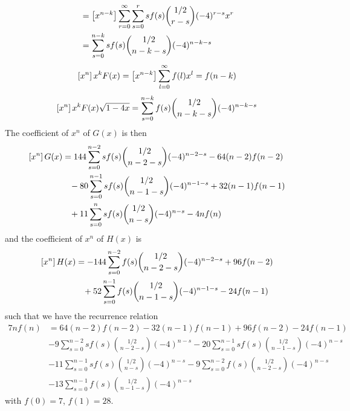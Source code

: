 \begin{solution}
\begin{align*}
    &= \coeff{x^{n-k}} \bsum[r]\sum_{s=0}^r sf(s) \binom{1/2}{r-s}(-4)^{r-s} x^r \\
    &= \sum_{s=0}^{n-k} sf(s) \binom{1/2}{n-k-s}(-4)^{n-k - s}
\end{align*}
\[
    \coeff{x^n} x^{k} F(x) = \coeff{x^{n-k}} \bsum[l] f(l)x^l = f(n-k)
\]
\begin{align*}
    \coeff{x^n} x^k F(x) \sqrt{1-4x}= \sum_{s=0}^{n-k} f(s) \binom{1/2}{n-k-s}(-4)^{n-k-s}
\end{align*}
The coefficient of $x^n$ of $G(x)$ is then
\begin{align*}
    \coeff{x^n}G(x) &= 144 \sum_{s=0}^{n-2} sf(s) \binom{1/2}{n-2-s}(-4)^{n-2-s} - 64 (n-2)f(n-2)  \\
    &\mspace{15mu} - 80\sum_{s=0}^{n-1} sf(s) \binom{1/2}{n-1-s} (-4)^{n-1-s} + 32 (n-1)f(n-1)  \\
    &\mspace{15mu} + 11 \sum_{s=0}^n sf(s) \binom{1/2}{n-s}(-4)^{n-s} - 4 n f(n)
\end{align*}
and the coefficient of $x^n$ of $H(x)$ is
\begin{align*}
    \coeff{x^n}H(x) &= -144 \sum_{s=0}^{n-2} f(s) \binom{1/2}{n-2-s} (-4)^{n-2-s} + 96 f(n-2) \\ &\mspace{15mu}  + 52 \sum_{s=0}^{n-1} f(s)\binom{1/2}{n-1-s} (-4)^{n-1-s} - 24 f(n-1)
\end{align*}
such that we have the recurrence relation
\begin{align*}
    7nf(n) &= 64(n-2)f(n-2) - 32(n-1)f(n-1) + 96f(n-2) -24f(n-1) \\
    &- 9\sum_{s=0}^{n-2} sf(s)\binom{1/2}{n-2-s}(-4)^{n-s} - 20 \sum_{s=0}^{n-1} sf(s) \binom{1/2}{n-1-s} (-4)^{n-s} \\
    & -11\sum_{s=0}^{n-1} sf(s) \binom{1/2}{n-s}(-4)^{n-s} - 9 \sum_{s=0}^{n-2} f(s) \binom{1/2}{n-2-s} (-4)^{n-s} \\
    &-13\sum_{s=0}^{n-1} f(s) \binom{1/2}{n-1-s} (-4)^{n-s}
\end{align*}
with $f(0)=7$, $f(1)=28$.


\end{solution}
